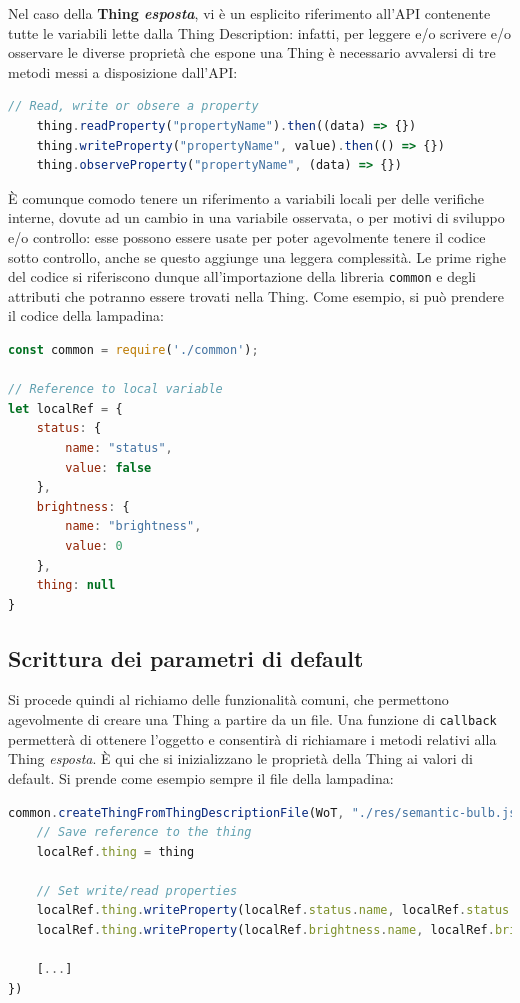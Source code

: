 \documentclass[12pt,a4paper,openright,oneside]{report}
\begin{document}
Nel caso della \textbf{Thing \textit{esposta}}, vi è un esplicito riferimento all'API contenente tutte le variabili lette dalla Thing Description: infatti, per leggere e/o scrivere e/o osservare le diverse proprietà che espone una Thing è necessario avvalersi di tre metodi messi a disposizione dall'API:
\begin{lstlisting}[language=JavaScript,caption={Metodi per leggere, scrivere o osservare}]
	// Read, write or obsere a property
	thing.readProperty("propertyName").then((data) => {})
	thing.writeProperty("propertyName", value).then(() => {})
	thing.observeProperty("propertyName", (data) => {})
\end{lstlisting}

È comunque comodo tenere un riferimento a variabili locali per delle verifiche interne, dovute ad un cambio in una variabile osservata, o per motivi di sviluppo e/o controllo: esse possono essere usate per poter agevolmente tenere il codice sotto controllo, anche se questo aggiunge una leggera complessità. Le prime righe del codice si riferiscono dunque all'importazione della libreria \texttt{common} e degli attributi che potranno essere trovati nella Thing. Come esempio, si può prendere il codice della lampadina:

\begin{lstlisting}[language=JavaScript,caption={Inizio del codice di \texttt{bulb.js}},label=lst:bulb.js]
const common = require('./common');

// Reference to local variable
let localRef = {
	status: {
		name: "status",
		value: false
	},
	brightness: {
		name: "brightness",
		value: 0
	},
	thing: null
}
\end{lstlisting}

\subsection{Scrittura dei parametri di default}
Si procede quindi al richiamo delle funzionalità comuni, che permettono agevolmente di creare una Thing a partire da un file. Una funzione di \texttt{callback} permetterà di ottenere l'oggetto e consentirà di richiamare i metodi relativi alla Thing \textit{esposta}. È qui che si inizializzano le proprietà della Thing ai valori di default. Si prende come esempio sempre il file della lampadina:

\begin{lstlisting}[language=JavaScript,caption={Creazione della Thing e inizializzazione proprietà read/write in \texttt{bulb.js}}]
common.createThingFromThingDescriptionFile(WoT, "./res/semantic-bulb.json", function(thing) {
	// Save reference to the thing
	localRef.thing = thing
	
	// Set write/read properties
	localRef.thing.writeProperty(localRef.status.name, localRef.status.value)
	localRef.thing.writeProperty(localRef.brightness.name, localRef.brightness.value)
	
	[...]
})
\end{lstlisting}
\end{document}
